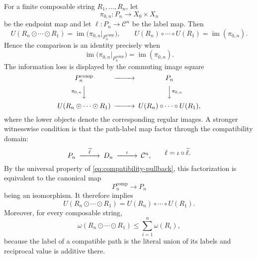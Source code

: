 For a finite composable string $R_1,\ldots,R_n$, let
\[
\pi_{0,n}:P_n\longrightarrow X_0\times X_n
\]
be the endpoint map and let $\ell:P_n\to\mathcal C^n$ be the label map.  Then
\begin{equation}\label{eq:strictness-endpoint-images}
U(R_n\odot\cdots\odot R_1)
=\operatorname{im}\bigl(\pi_{0,n}|_{P_n^{\mathrm{comp}}}\bigr),
\qquad
U(R_n)\circ\cdots\circ U(R_1)
=\operatorname{im}(\pi_{0,n}).
\end{equation}
Hence the comparison is an identity precisely when
\begin{equation}\label{eq:strictness-endpoint-criterion}
\operatorname{im}\bigl(\pi_{0,n}|_{P_n^{\mathrm{comp}}}\bigr)
=
\operatorname{im}(\pi_{0,n}).
\end{equation}
The information loss is displayed by the commuting image square
\begin{equation}\label{eq:strictness-information-square}
\begin{CD}
P_n^{\mathrm{comp}} @>>> P_n\\
@V{\pi_{0,n}}VV @VV{\pi_{0,n}}V\\
U(R_n\odot\cdots\odot R_1) @>>>
U(R_n)\circ\cdots\circ U(R_1),
\end{CD}
\end{equation}
where the lower objects denote the corresponding regular images.  A stronger witnesswise condition is that the path-label map factor through the compatibility domain:
\begin{equation}\label{eq:compatibility-factorization}
\begin{CD}
P_n @>{\widetilde\ell}>> D_n @>{\iota}>> \mathcal C^n,
\end{CD}
\qquad
\ell=\iota\circ\widetilde\ell.
\end{equation}
By the universal property of \eqref{eq:compatibility-pullback}, this factorization is equivalent to the canonical map
\[
P_n^{\mathrm{comp}}\longrightarrow P_n
\]
being an isomorphism.  It therefore implies
\begin{equation}\label{eq:rel-strictification}
U(R_n\odot\cdots\odot R_1)
=
U(R_n)\circ\cdots\circ U(R_1).
\end{equation}
Moreover, for every composable string,
\begin{equation}\label{eq:mass-subadditive}
\omega(R_n\odot\cdots\odot R_1)
\le\sum_{i=1}^n\omega(R_i),
\end{equation}
because the label of a compatible path is the literal union of its labels and reciprocal value is additive there.

